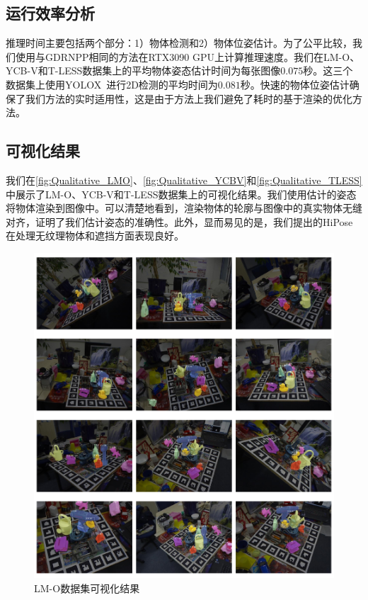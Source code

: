 \subsection{运行效率分析}

推理时间主要包括两个部分：1）物体检测和2）物体位姿估计。为了公平比较，我们使用与GDRNPP相同的方法在RTX3090 GPU上计算推理速度。我们在LM-O、YCB-V和T-LESS数据集上的平均物体姿态估计时间为每张图像$0.075$秒。这三个数据集上使用YOLOX~\cite{Ge2021YOLOXEY}进行2D检测的平均时间为$0.081$秒。快速的物体位姿估计确保了我们方法的实时适用性，这是由于方法上我们避免了耗时的基于渲染的优化方法。

\subsection{可视化结果}
我们在\autoref{fig:Qualitative_LMO}、\autoref{fig:Qualitative_YCBV}和\autoref{fig:Qualitative_TLESS}中展示了LM-O\cite{Brachmann2016UncertaintyDriven6P}、YCB-V\cite{ycbv}和T-LESS\cite{tless}数据集上的可视化结果。我们使用估计的姿态将物体渲染到图像中。可以清楚地看到，渲染物体的轮廓与图像中的真实物体无缝对齐，证明了我们估计姿态的准确性。此外，显而易见的是，我们提出的HiPose在处理无纹理物体和遮挡方面表现良好。

\begin{figure}
    \centering
    \includegraphics[width=1\linewidth]{figure/hipose/lmo_visulize.pdf}
    \caption{LM-O数据集可视化结果}
    \label{fig:Qualitative_LMO}
\end{figure}

